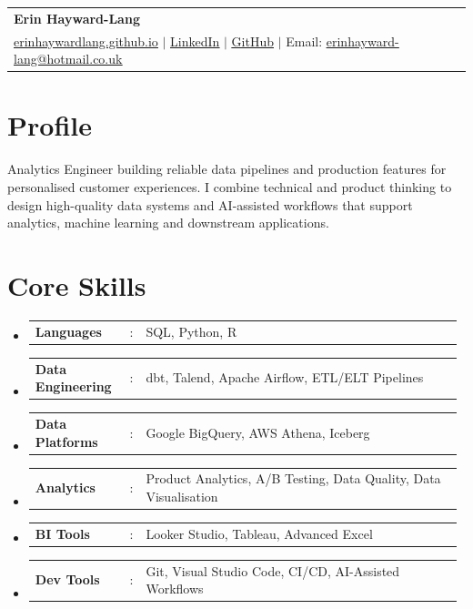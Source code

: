 \documentclass[a4paper,10pt]{article}
\newcommand{\resumeSectionType}[3]{
  \item\begin{tabular*}{0.96\textwidth}[t]{
    p{0.22\linewidth}p{0.02\linewidth}p{0.74\linewidth}
  }
    \strut\textbf{#1} & #2 & #3
  \end{tabular*}\vspace{-2pt}
}
\newcommand{\resumeHeadingListStart}{
  \begin{itemize}[leftmargin=0.15in, label={}, itemsep=2pt]
}
\newcommand{\resumeHeadingListEnd}{\end{itemize}}
\begin{document}
\color{bodytext} %


\begin{tabular*}{\textwidth}{l@{\extracolsep{\fill}}r}
  \textcolor{accent}{\textbf{\Huge Erin Hayward-Lang \vspace{2pt}}} & \\ %
  \href{https://erinhaywardlang.github.io/index.html}{\uline{erinhaywardlang.github.io}} $|$ %
  \href{https://www.linkedin.com/in/erin-hayward-lang}{\uline{LinkedIn}} $|$ %
  \href{https://github.com/ErinHaywardLang}{\uline{GitHub}} $|$ %
  Email: \href{mailto:erinhayward-lang@hotmail.co.uk}{\uline{erinhayward-lang@hotmail.co.uk}} & \\ %
\end{tabular*}



\section{Profile}
\small{
    Analytics Engineer building reliable data pipelines and production features for personalised customer experiences. I combine technical and product thinking to design high-quality data systems and AI-assisted workflows that support analytics, machine learning and downstream applications. 
}



\section{Core Skills}
  \resumeHeadingListStart{}
    \resumeSectionType{Languages}{:}{SQL, Python, R}
    \resumeSectionType{Data Engineering}{:}{dbt, Talend, Apache Airflow, ETL/ELT Pipelines}
    \resumeSectionType{Data Platforms}{:}{Google BigQuery, AWS Athena, Iceberg}
    \resumeSectionType{Analytics}{:}{Product Analytics, A/B Testing, Data Quality, Data Visualisation}
    \resumeSectionType{BI Tools}{:}{Looker Studio, Tableau, Advanced Excel}
    \resumeSectionType{Dev Tools}{:}{Git, Visual Studio Code, CI/CD, AI-Assisted Workflows}
  \resumeHeadingListEnd{}
\end{document}
